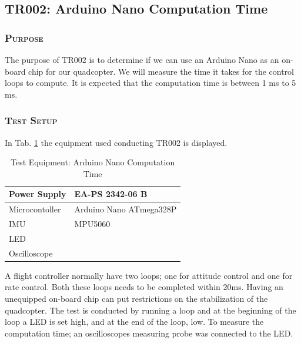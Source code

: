 
\subsection{TR002: Arduino Nano Computation Time}
         {}
                         
\subsubsection*{\textsc{\medium Purpose}}
The purpose of TR002 is to determine if we can use an Arduino Nano as an on-board chip for our quadcopter. We will measure the time it takes for the control loops to compute. It is expected that the computation time is between 1 ms to 5 ms. 

\subsubsection*{\textsc{\medium Test Setup}}
In Tab. \ref{tab:tabt4} the equipment used conducting TR002 is displayed. 
\begin {table}[H]
    \begin{center}
    \caption {Test Equipment: Arduino Nano Computation Time} 
    \label{tab:tabt4} 
    \begin{tabular}{|l|l|}\hline 
        Power Supply & EA-PS 2342-06 B     \\ \hline
        Microcontoller & Arduino Nano ATmega328P \\ \hline
        IMU & MPU5060 \\ \hline
        LED & \\ \hline
        Oscilloscope & \\ \hline
        \end{tabular}
    \end{center}
\end{table}

\noindent A flight controller normally have two loops; one for attitude control and one for rate control. Both these loops needs to be completed within 20ms. Having an unequipped on-board chip can put restrictions on the stabilization of the quadcopter. The test is conducted by running a loop and at the beginning of the loop a LED is set high, and at the end of the loop, low. To measure the computation time; an oscilloscopes measuring probe was connected to the LED. 

